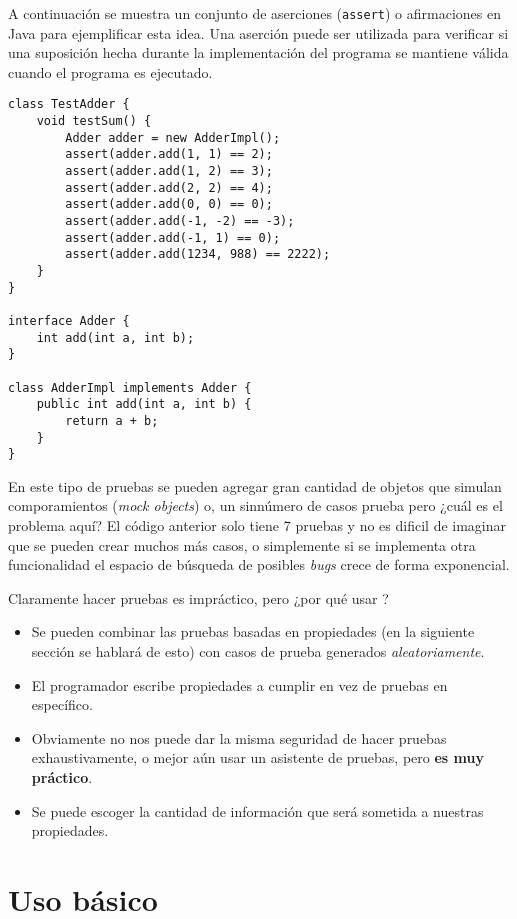 A continuación se muestra un conjunto de aserciones (\texttt{assert}) o 
afirmaciones en Java para ejemplificar esta idea. Una aserción puede ser 
utilizada para verificar si una suposición hecha durante la implementación del 
programa se mantiene válida cuando el programa es ejecutado.

\begin{verbatim}
class TestAdder {
    void testSum() {
        Adder adder = new AdderImpl();
        assert(adder.add(1, 1) == 2);
        assert(adder.add(1, 2) == 3);
        assert(adder.add(2, 2) == 4);
        assert(adder.add(0, 0) == 0);
        assert(adder.add(-1, -2) == -3);
        assert(adder.add(-1, 1) == 0);
        assert(adder.add(1234, 988) == 2222);
    }
}

interface Adder {
    int add(int a, int b);
}

class AdderImpl implements Adder {
    public int add(int a, int b) {
        return a + b;
    }
}
\end{verbatim}

En este tipo de pruebas se pueden agregar gran cantidad de objetos que simulan 
comporamientos (\textit{mock objects}) o, un sinnúmero de casos prueba pero 
¿cuál es el problema aquí? El código anterior solo tiene 7 pruebas y no es 
dificil de imaginar que se pueden crear muchos más casos, o simplemente si se 
implementa otra funcionalidad el espacio de búsqueda de posibles \textit{bugs}
crece de forma exponencial.

Claramente hacer pruebas es impráctico, pero ¿por qué usar {\QuickCheck}?
\begin{itemize}
\item Se pueden combinar las pruebas basadas en propiedades (en la siguiente 
sección se hablará de esto) con casos de prueba generados 
\textit{aleatoriamente}.
\item El programador escribe propiedades a cumplir en vez de pruebas en 
específico.
\item Obviamente no nos puede dar la misma seguridad de hacer pruebas 
exhaustivamente, o mejor aún usar un asistente de pruebas, pero \textbf{es muy 
práctico}.
\item Se puede escoger la cantidad de información que será sometida a nuestras 
propiedades.
\end{itemize}


\section{Uso básico}

